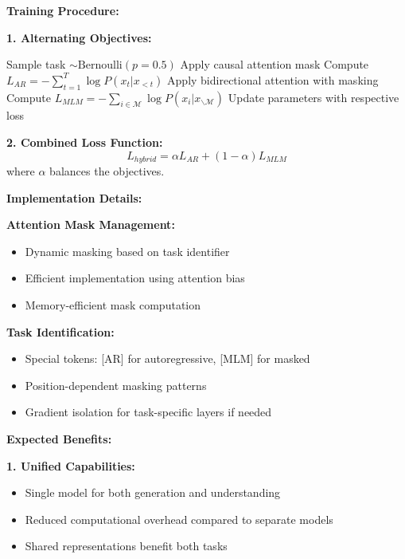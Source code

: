 \documentclass[12pt]{article}
\begin{document}
\begin{center}
\begin{enumerate}[(a)]
{    \textbf{Training Procedure:}
    
    \textbf{1. Alternating Objectives:}
    \begin{algorithmic}[1]
        \STATE Sample task $\sim \text{Bernoulli}(p=0.5)$
            \STATE Apply causal attention mask
            \STATE Compute $L_{AR} = -\sum_{t=1}^T \log P(x_t | x_{<t})$
        \ELSE
            \STATE Apply bidirectional attention with masking
            \STATE Compute $L_{MLM} = -\sum_{i \in \mathcal{M}} \log P(x_i | x_{\backslash \mathcal{M}})$
        \ENDIF
        \STATE Update parameters with respective loss
    \ENDFOR
    \end{algorithmic}
    
    \textbf{2. Combined Loss Function:}
    $$L_{hybrid} = \alpha L_{AR} + (1-\alpha) L_{MLM}$$
    where $\alpha$ balances the objectives.
    
    \textbf{Implementation Details:}
    
    \textbf{Attention Mask Management:}
    \begin{itemize}
        \item Dynamic masking based on task identifier
        \item Efficient implementation using attention bias
        \item Memory-efficient mask computation
    \end{itemize}
    
    \textbf{Task Identification:}
    \begin{itemize}
        \item Special tokens: [AR] for autoregressive, [MLM] for masked
        \item Position-dependent masking patterns
        \item Gradient isolation for task-specific layers if needed
    \end{itemize}
    
    \textbf{Expected Benefits:}
    
    \textbf{1. Unified Capabilities:}
    \begin{itemize}
        \item Single model for both generation and understanding
        \item Reduced computational overhead compared to separate models
        \item Shared representations benefit both tasks
    \end{itemize}
    
}
\end{enumerate}
\end{center}
\end{document}
